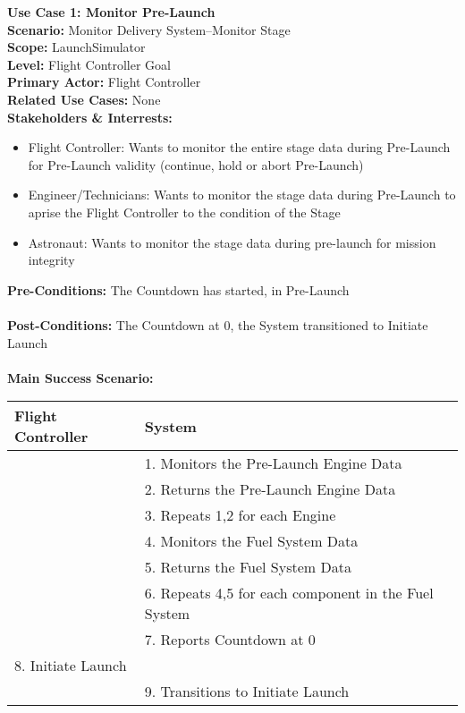 \documentclass[letterpaper]{article}
\begin{document}
\noindent
\textbf{Use Case 1:  Monitor Pre-Launch}\\
\textbf{Scenario:  }Monitor Delivery System--Monitor Stage\\
\textbf{Scope:  }LaunchSimulator\\
\textbf{Level:  }Flight Controller Goal\\
\textbf{Primary Actor:  }Flight Controller\\
\textbf{Related Use Cases:  }None\\
\textbf{Stakeholders \& Interrests:}
\begin{itemize}
\item Flight Controller:  Wants to monitor the entire stage data during
Pre-Launch for Pre-Launch validity (continue, hold or abort Pre-Launch)
\item Engineer/Technicians:  Wants to monitor the stage data during
Pre-Launch to aprise the Flight Controller to the condition of the
Stage
\item Astronaut:  Wants to monitor the stage data during pre-launch
for mission integrity
\end{itemize}
\textbf{Pre-Conditions:  }The Countdown has started, in Pre-Launch\\\\
\textbf{Post-Conditions:  }The Countdown at 0, the System transitioned
to Initiate Launch\\\\
\textbf{Main Success Scenario:}\\
\begin{tabular}{|p{5.75cm}|p{5.75cm}|}\hline
\textbf{Flight Controller} & \textbf{System}\\\hline
& 1.  Monitors the Pre-Launch Engine Data\\\hline
& 2.  Returns the Pre-Launch Engine Data\\\hline
& 3.  Repeats 1,2 for each Engine\\\hline
& 4.  Monitors the Fuel System Data\\\hline
& 5.  Returns the Fuel System Data\\\hline
& 6.  Repeats 4,5 for each component in the Fuel System\\\hline
& 7.  Reports Countdown at 0\\\hline
8.  Initiate Launch & \\\hline
& 9.  Transitions to Initiate Launch\\\hline
\end{tabular}\\\\
\end{document}
